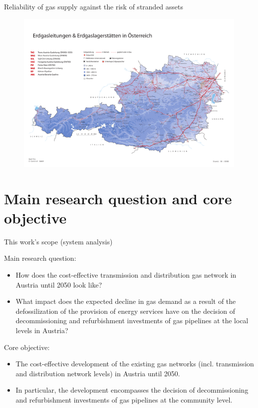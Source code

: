 \documentclass[aspectratio=169]{beamer}
\begin{document}
\begin{frame}[t]{Reliability of gas supply against the risk of stranded assets}
	\vspace{-1cm}
	\begin{figure}
		\centering
		\includegraphics[scale=0.25]{gas_network}
		\vspace*{-1\textheight}
	\end{figure}
 \centering\vfill
 \vspace{2cm}
 \fontsize{40}{72}\selectfont\color{black}
 \vfill 
\end{frame}


\section[]{Main research question and core objective}
\begin{frame}[t]{This work's scope (system analysis)}
	\begin{block}{Main research question:}
		\begin{itemize}
			\item  How does the cost-effective transmission and distribution gas network in Austria until 2050 look like?
			\item What impact does the expected decline in gas demand as a result of the defossilization of the provision of energy services have on the decision of decommissioning and refurbishment investments of gas pipelines at the local levels in Austria?
		\end{itemize}		 
	\end{block}

	\begin{block}{Core objective:}
		\begin{itemize}
			\item  The cost-effective development of the existing gas networks (incl. transmission and distribution network levels) in Austria until 2050.
			\item  In particular, the development encompasses the decision of decommissioning and refurbishment investments of gas pipelines at the community level.
		\end{itemize}		 
	\end{block}
\end{frame}
	
\end{document}
